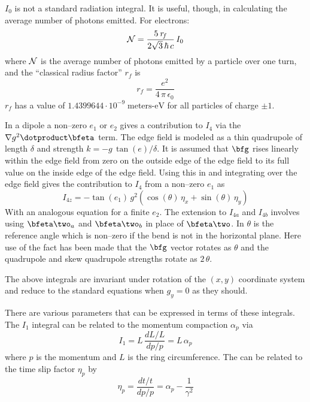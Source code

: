 $I_0$ is not a standard radiation integral. It is useful, though, in calculating the average number
of photons emitted. For electrons:
  \begin{equation}
    {\cal N} = \frac{5 \: r_{\! f}}{2 \sqrt{3} \, \hbar \, c} \, I_0 
  \end{equation}
where $\cal N$ is the average number of photons emitted by a particle
over one turn, and the ``classical radius factor'' $r_{\! f}$ is 
  \begin{equation}
    r_{\! f} = \frac{e^2}{4 \, \pi \, \epsilon_0} 
  \end{equation}
$r_{\! f}$ has a value of $1.4399644 \cdot 10^{-9} \; \text{meters-eV}$
for all particles of charge $\pm 1$.

In a dipole a non--zero $e_1$ or $e_2$ gives a contribution to $I_4$ via the $\nabla g^2 \dotproduct
\bfeta$ term. The edge field is modeled as a thin quadrupole of length $\delta$ and strength $k = -g
\, \tan(e) / \delta$. It is assumed that $\bfg$ rises linearly within the edge field from zero on
the outside edge of the edge field to its full value on the inside edge of the edge field. Using
this in  and integrating over the edge field gives the contribution to $I_4$ from a
non--zero $e_1$ as
  \begin{equation}
    I_{4z} = -\tan(e_1) \, g^2
    \left( \cos(\theta) \, \eta_x + \sin(\theta) \, \eta_y \right)
    \label{iegct}
  \end{equation}
With an analogous equation for a finite $e_2$. The extension to $I_{4a}$ and $I_{4b}$ involves using
$\bfeta\two_a$ and $\bfeta\two_b$ in place of $\bfeta\two$.  In  $\theta$ is the reference
 angle which is non--zero if the bend is not in the horizontal plane. Here use of the fact
has been made that the $\bfg$ vector rotates as $\theta$ and the quadrupole and skew quadrupole
strengths rotate as $2\, \theta$.

The above integrals are invariant under rotation of the $(x,y)$ coordinate system and reduce to the
standard equations when $g_y = 0$ as they should.

There are various parameters that can be expressed in terms of these integrals. The $I_1$ integral
can be related to the momentum compaction $\alpha_p$ via
  \begin{equation}
    I_1 = L \, \frac{dL/L}{dp/p} = L \, \alpha_p
  \end{equation}
where $p$ is the momentum and $L$ is the ring circumference. The can be related to the time slip
factor $\eta_p$ by
\begin{equation}
  \eta_p = \frac{dt/t}{dp/p} = \alpha_p - \frac{1}{\gamma^2}
\end{equation}

